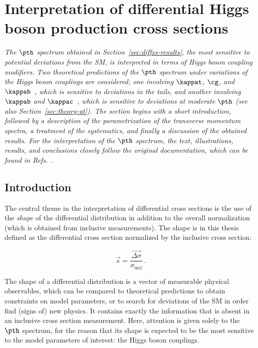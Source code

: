 \section{Interpretation of differential Higgs boson production cross sections}
\label{sec:interpretation}

\emph{%
The $\pth$ spectrum obtained in Section~\ref{sec:diffxs-results}, the most sensitive to potential deviations from the SM, is interpreted in terms of Higgs boson coupling modifiers.
% 
Two theoretical predictions of the $\pth$ spectrum under variations of the Higgs boson couplings are considered; one involving $\kappat$, $\cg$, and $\kappab$~\cite{Grazzini:2017szg,Grazzini:2016paz}, which is sensitive to deviations in the tails, and another involving $\kappab$ and $\kappac$~\cite{Bishara:2016jga}, which is sensitive to deviations at moderate $\pth$ (see also Section~\ref{sec:theory-pt}).
% 
The section begins with a short introduction, followed by a description of the parametrization of the transverse momentum spectra, a treatment of the systematics, and finally a discussion of the obtained results.
% 
For the interpretation of the $\pth$ spectrum, the text, illustrations, results, and conclusions closely follow the original documentation, which can be found in Refs.~\cite{AN-17-244,HIG-17-028}.
}


\subsection{Introduction}

The central theme in the interpretation of differential cross sections is the use of the \emph{shape} of the differential distribution in addition to the overall normalization (which is obtained from inclusive measurements).
% 
The shape is in this thesis defined as the differential cross section normalized by the inclusive cross section:
% 
\begin{linenomath*}
\begin{equation}
\label{eq:interpretation-shape}
\vec{s} = \frac{\vec{\Delta\sigma}}{\sigma_\text{incl}}
\,.
\end{equation}
\end{linenomath*}
% 
The shape of a differential distribution is a vector of measurable physical observables, which can be compared to theoretical predictions to obtain constraints on model parameters, or to search for deviations of the SM in order find (signs of) new physics.
% 
It contains exactly the information that is absent in an inclusive cross section measurement.
% 
Here, attention is given solely to the $\pth$ spectrum, for the reason that its shape is expected to be the most sensitive to the model parameters of interest: the Higgs boson couplings.


